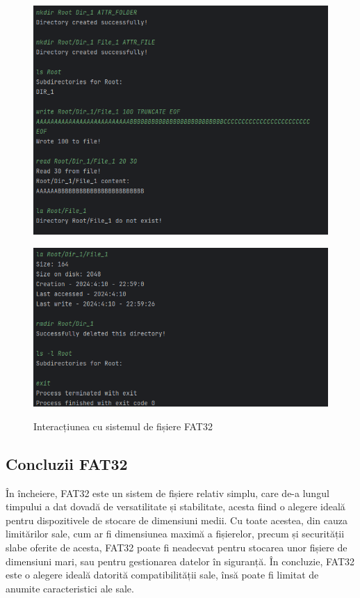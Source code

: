 \begin{figure}[h]
    \centering
    \includegraphics[width=1.0\linewidth]{images/2.5.1.png}
    \label{fig:enter-label}
\end{figure}

\clearpage
\begin{figure}[t!]

    \includegraphics[width=1.0\linewidth]{images/2.5.2.png}
    \label{fig:enter-label}
    \caption{Interacțiunea cu sistemul de fișiere FAT32}
\end{figure}

\bigskip


\subsection{Concluzii FAT32}

În încheiere, FAT32 este un sistem de fișiere relativ simplu, care de-a lungul timpului a dat dovadă de versatilitate și stabilitate, acesta fiind o alegere ideală pentru dispozitivele de stocare de dimensiuni medii. Cu toate acestea, din cauza limitărilor sale, cum ar fi dimensiunea maximă a fișierelor, precum și securității slabe oferite de acesta, FAT32 poate fi neadecvat pentru stocarea unor fișiere de dimensiuni mari, sau pentru gestionarea datelor în siguranță. În concluzie, FAT32 este o alegere ideală datorită compatibilității sale, însă poate fi limitat de anumite caracteristici ale sale.